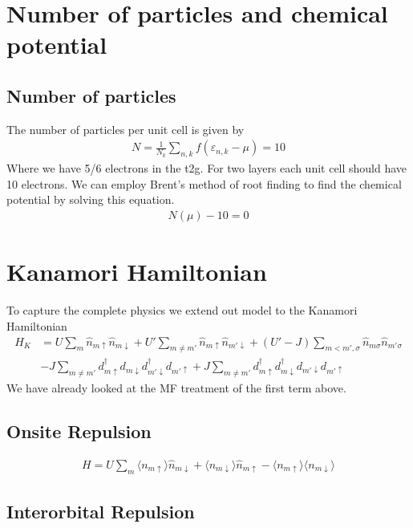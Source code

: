 \documentclass[11pt]{article}
\begin{document}
\section{Number of particles and chemical potential}
\subsection{Number of particles}
The number of particles per unit cell is given by
\begin{align}
    N = \frac{1}{N_k}\sum_{n,k} f(\varepsilon_{n,k} - \mu) = 10
\end{align}
Where we have 5/6 electrons in the t2g. For two layers each unit cell should
have 10 electrons. We can employ Brent's method of root finding to find the chemical
potential by solving this equation.
\begin{gather}
    N(\mu) - 10 = 0
\end{gather}
\section{Kanamori Hamiltonian}
To capture the complete physics we extend out model to the Kanamori Hamiltonian
\begin{align}
    H_K &= U\sum_m \hat n_{m \uparrow} \hat n_{m \downarrow} 
    + U' \sum_{m \neq m'} \hat n_{m \uparrow}  \hat n_{m' \downarrow} 
    + (U'-J) \sum_{m < m', \sigma} \hat n_{m\sigma} \hat n_{m' \sigma} \\\nonumber
    &- J \sum_{m \neq m'} d^\dagger_{m\uparrow} d_{m \downarrow}d^\dagger_{m' \downarrow}d_{m'\uparrow}
    + J \sum_{m \neq m'} d^\dagger_{m\uparrow} d^\dagger_{m \downarrow} d_{m' \downarrow} d_{m' \uparrow}
\end{align}
We have already looked at the MF treatment of the first term above.
\subsection{Onsite Repulsion}
\begin{gather}
        H = U \sum_m \langle n_{m\uparrow}\rangle \hat n_{m\downarrow} + \langle n_{m\downarrow}\rangle \hat n_{m\uparrow} - \langle n_{m\uparrow}\rangle \langle n_{m\downarrow}\rangle
\end{gather}
\subsection{Interorbital Repulsion}
\end{document}
